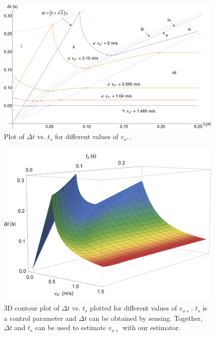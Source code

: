\documentclass[letterpaper, 10 pt, conference]{ieeeconf}  %
\begin{document}
\begin{figure}
	\includegraphics[width=\linewidth]{deltVsts_differentVop.pdf}
	\caption[Variation of time between impacts with switching time for partially closed-loop control]{Plot of $\Delta t$ vs. $t_s$ for different values of $v_{o^+}$.}
	\label{delTvsTs}
\end{figure}
\begin{figure}
	\includegraphics[width=\linewidth]{3Dcontour_view1.pdf}
	\caption[3D contour plot of time between impacts vs. switching time vs. initial velocity - 1]{3D contour plot of $\Delta t$ vs. $t_s$ plotted for different values of $v_{o+}$.   $t_s$ is a control parameter and $\Delta t$ can be obtained by sensing.  Together, $\Delta t$ and $t_s$ can be used to estimate $v_{o+}$ with our estimator.}
	\label{3Dcontour}
\end{figure}
\end{document}
